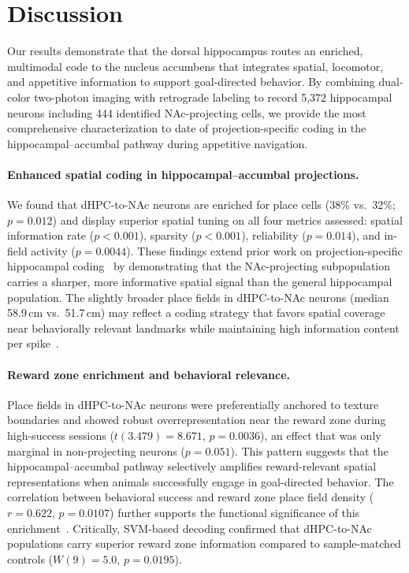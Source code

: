 \documentclass[11pt]{article}
\begin{document}
\section{Discussion}

Our results demonstrate that the dorsal hippocampus routes an enriched, multimodal code to the nucleus accumbens that integrates spatial, locomotor, and appetitive information to support goal-directed behavior. By combining dual-color two-photon imaging with retrograde labeling to record 5,372 hippocampal neurons including 444 identified NAc-projecting cells, we provide the most comprehensive characterization to date of projection-specific coding in the hippocampal--accumbal pathway during appetitive navigation.

\paragraph{Enhanced spatial coding in hippocampal--accumbal projections.}
We found that dHPC-to-NAc neurons are enriched for place cells (38\% vs.\ 32\%; $p=0.012$) and display superior spatial tuning on all four metrics assessed: spatial information rate ($p<0.001$), sparsity ($p<0.001$), reliability ($p=0.014$), and in-field activity ($p=0.0044$). These findings extend prior work on projection-specific hippocampal coding~\citep{ciocchi2015, danielson2016} by demonstrating that the NAc-projecting subpopulation carries a sharper, more informative spatial signal than the general hippocampal population. The slightly broader place fields in dHPC-to-NAc neurons (median 58.9\,cm vs.\ 51.7\,cm) may reflect a coding strategy that favors spatial coverage near behaviorally relevant landmarks while maintaining high information content per spike~\citep{skaggs1996, sosa2018}.

\paragraph{Reward zone enrichment and behavioral relevance.}
Place fields in dHPC-to-NAc neurons were preferentially anchored to texture boundaries and showed robust overrepresentation near the reward zone during high-success sessions ($t(3.479)=8.671$, $p=0.0036$), an effect that was only marginal in non-projecting neurons ($p=0.051$). This pattern suggests that the hippocampal--accumbal pathway selectively amplifies reward-relevant spatial representations when animals successfully engage in goal-directed behavior. The correlation between behavioral success and reward zone place field density ($r=0.622$, $p=0.0107$) further supports the functional significance of this enrichment~\citep{dupret2010, gauthier2018}. Critically, SVM-based decoding confirmed that dHPC-to-NAc populations carry superior reward zone information compared to sample-matched controls ($W(9)=5.0$, $p=0.0195$).
\end{document}
